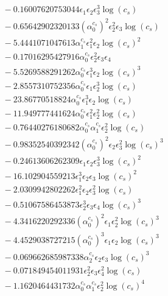 \documentclass[10pt]{article}
\begin{document}
\begin{align*}
&{}  - 0.16007620753044 \epsilon_{1} \epsilon_{2} \epsilon_{3}^{3} \log{\left(c_{s} \right)} \\
&{}  - 0.65642902320133 \left(\alpha_{0}^{c_s}\right)^{2} \epsilon_{2}^{2} \epsilon_{3} \log{\left(c_{s} \right)} \\
&{}  - 5.4441071047613 \alpha_{1}^{c_s} \epsilon_{1}^{2} \epsilon_{2} \log{\left(c_{s} \right)}^{2} \\
&{}  - 0.17016295427916 \alpha_{0}^{c_s} \epsilon_{2}^{2} \epsilon_{3} \epsilon_{4} \\
&{}  - 5.5269588291262 \alpha_{0}^{c_s} \epsilon_{1}^{3} \epsilon_{2} \log{\left(c_{s} \right)}^{3} \\
&{}  - 2.8557310752356 \alpha_{0}^{c_s} \epsilon_{1} \epsilon_{2}^{3} \log{\left(c_{s} \right)} \\
&{}  - 23.86770518824 \alpha_{0}^{c_s} \epsilon_{1}^{3} \epsilon_{2} \log{\left(c_{s} \right)} \\
&{}  - 11.949777441624 \alpha_{0}^{c_s} \epsilon_{1}^{2} \epsilon_{2}^{2} \log{\left(c_{s} \right)} \\
&{}  - 0.76440276180682 \alpha_{0}^{c_s} \alpha_{1}^{c_s} \epsilon_{2}^{2} \log{\left(c_{s} \right)} \\
&{}  - 0.98352540392342 \left(\alpha_{0}^{c_s}\right)^{2} \epsilon_{2} \epsilon_{3}^{2} \log{\left(c_{s} \right)}^{3} \\
&{}  - 0.24613606262309 \epsilon_{1} \epsilon_{2} \epsilon_{3}^{3} \log{\left(c_{s} \right)}^{2} \\
&{}  - 16.102904559213 \epsilon_{1}^{3} \epsilon_{2} \epsilon_{3} \log{\left(c_{s} \right)}^{2} \\
&{}  - 2.0309942802262 \epsilon_{1}^{2} \epsilon_{2} \epsilon_{3}^{2} \log{\left(c_{s} \right)} \\
&{}  - 0.51067586453873 \epsilon_{2}^{3} \epsilon_{3} \epsilon_{4} \log{\left(c_{s} \right)}^{3} \\
&{}  - 4.3416220292336 \left(\alpha_{0}^{c_s}\right)^{2} \epsilon_{1} \epsilon_{2}^{2} \log{\left(c_{s} \right)}^{3} \\
&{}  - 4.4529038727215 \left(\alpha_{0}^{c_s}\right)^{3} \epsilon_{1} \epsilon_{2} \log{\left(c_{s} \right)}^{3} \\
&{}  - 0.069662685987338 \alpha_{2}^{c_s} \epsilon_{2} \epsilon_{3} \log{\left(c_{s} \right)}^{3} \\
&{}  - 0.071849454011931 \epsilon_{2}^{2} \epsilon_{3} \epsilon_{4}^{2} \log{\left(c_{s} \right)} \\
&{}  - 1.1620464431732 \alpha_{0}^{c_s} \alpha_{1}^{c_s} \epsilon_{2}^{2} \log{\left(c_{s} \right)}^{4} \\

\end{align*}
\end{document}
